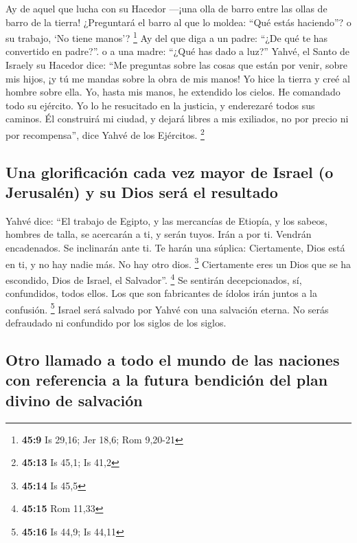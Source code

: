  Ay de aquel que lucha con su Hacedor ---¡una olla de
barro entre las ollas de barro de la tierra! ¿Preguntará el barro al que
lo moldea: ``Qué estás haciendo''? o su trabajo, `No tiene manos'?
\footnote{\textbf{45:9} Is 29,16; Jer 18,6; Rom 9,20-21} 
Ay del que diga a un padre: ``¿De qué te has convertido en padre?''. o a
una madre: ``¿Qué has dado a luz?''  Yahvé, el Santo de
Israely su Hacedor dice: ``Me preguntas sobre las cosas que están por
venir, sobre mis hijos, ¡y tú me mandas sobre la obra de mis manos!
 Yo hice la tierra y creé al hombre sobre ella. Yo, hasta
mis manos, he extendido los cielos. He comandado todo su ejército.
 Yo lo he resucitado en la justicia, y enderezaré todos
sus caminos. Él construirá mi ciudad, y dejará libres a mis exiliados,
no por precio ni por recompensa'', dice Yahvé de los Ejércitos.
\footnote{\textbf{45:13} Is 45,1; Is 41,2}

\hypertarget{una-glorificaciuxf3n-cada-vez-mayor-de-israel-o-jerusaluxe9n-y-su-dios-seruxe1-el-resultado}{%
\subsection{Una glorificación cada vez mayor de Israel (o Jerusalén) y
su Dios será el
resultado}\label{una-glorificaciuxf3n-cada-vez-mayor-de-israel-o-jerusaluxe9n-y-su-dios-seruxe1-el-resultado}}

 Yahvé dice: ``El trabajo de Egipto, y las mercancías de
Etiopía, y los sabeos, hombres de talla, se acercarán a ti, y serán
tuyos. Irán a por ti. Vendrán encadenados. Se inclinarán ante ti. Te
harán una súplica: Ciertamente, Dios está en ti, y no hay nadie más. No
hay otro dios. \footnote{\textbf{45:14} Is 45,5} 
Ciertamente eres un Dios que se ha escondido, Dios de Israel, el
Salvador''. \footnote{\textbf{45:15} Rom 11,33}  Se
sentirán decepcionados, sí, confundidos, todos ellos. Los que son
fabricantes de ídolos irán juntos a la confusión. \footnote{\textbf{45:16}
  Is 44,9; Is 44,11}  Israel será salvado por Yahvé con
una salvación eterna. No serás defraudado ni confundido por los siglos
de los siglos.

\hypertarget{otro-llamado-a-todo-el-mundo-de-las-naciones-con-referencia-a-la-futura-bendiciuxf3n-del-plan-divino-de-salvaciuxf3n}{%
\subsection{Otro llamado a todo el mundo de las naciones con referencia
a la futura bendición del plan divino de
salvación}\label{otro-llamado-a-todo-el-mundo-de-las-naciones-con-referencia-a-la-futura-bendiciuxf3n-del-plan-divino-de-salvaciuxf3n}}

